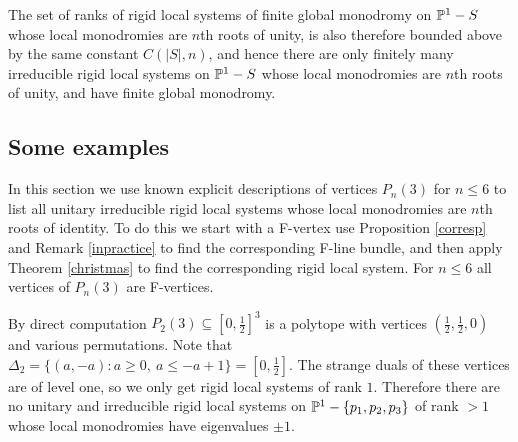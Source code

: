 The set of ranks of rigid local systems of finite global monodromy on $\Bbb{P}^1-S$ whose local monodromies are $n$th roots of unity, is also therefore bounded above by the same constant $C(|S|, n)$, and hence there are only finitely many irreducible rigid local systems on $\Bbb{P}^1-S$ whose local monodromies are $n$th roots of unity, and have finite global monodromy.
\fi

\subsection{Some examples}\label{smalln}

In this section we use known explicit descriptions of vertices $P_n(3)$ for $n\leq 6$ to list all unitary irreducible rigid local systems whose local monodromies are $n$th roots of identity.  To do this we  start with a F-vertex use Proposition \ref{corresp} and Remark \ref{inpractice} to find the corresponding F-line bundle, and then apply Theorem \ref{christmas} to find the corresponding rigid local system. For $n\leq 6$ all vertices of $P_n(3)$ are F-vertices.


By direct computation $P_2(3)\subseteq[0,\frac{1}{2}]^3$ is a polytope with vertices $(\frac{1}{2}, \frac{1}{2},0)$ and various permutations. Note that $\Delta_2=\{(a,-a): a\geq 0,\ a\leq -a +1\}=[0,\frac{1}{2}]$.
The strange duals of these vertices are of level one, so we only get rigid local systems of rank $1$. Therefore there are no unitary and irreducible  rigid local systems on $\Bbb{P}^{1}-\{p_1,p_2,p_3\}$ of rank $>1$ whose local monodromies have eigenvalues $\pm 1$.


